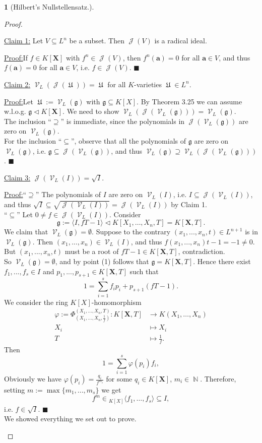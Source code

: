\documentclass[12pt,a4paper]{report}
\theoremstyle{definition}
\theoremstyle{num.custom-title}
\newtheorem{teo_custom-title}[theorem]{} %
\newenvironment{claim}[1]{\par\noindent\underline{Claim#1:}\space}{} %
\newenvironment{claimproof}[1]{\par\noindent\underline{Proof:}\space#1}{\leavevmode\unskip\penalty9999 \hbox{}\nobreak\hfill\quad\hbox{$\blacksquare$}} %
\DeclareMathOperator{\J}{\mathcal{J}}
\DeclareMathOperator{\N}{\mathbb{N}}
\DeclareMathOperator{\U}{\mathfrak{U}}
\DeclareMathOperator{\V}{\mathcal{V}}
\DeclareMathOperator{\sse}{\subseteq}
\newcommand{\g}{\mathfrak{g}}
\newcommand{\X}{\mathbf{X}}
\renewcommand{\phi}{\varphi}
\begin{document}
\begin{teo_custom-title}[Hilbert's Nullstellensatz.]
\begin{proof}
\begin{enumerate}
\begin{claim}{ 1}
Let $V \sse L^n$ be a subset. Then $\J(V)$ is a radical ideal.
\begin{claimproof}
If $f \in K[\X]$ with $f^n \in \J(V)$, then $f^n(\mathbf{a})=0$ for all $\mathbf{a} \in V$, and thus $f(\mathbf{a})=0$ for all $\mathbf{a} \in V$, i.e. $f \in \J(V)$.
\end{claimproof}
\end{claim}
\begin{claim}{ 2}
$\V_L(\J(\U))=\U$ for all $K$-varieties $\U \in L^n$.
\begin{claimproof}
Let $\U := \V_L(\g)$ with $\g \sse K[X]$. By Theorem 3.25 we can assume w.l.o.g. $\g \lhd K[\X]$. We need to show $\V_L(\J(\V_L(\g))) = \V_L(\g)$.\\
The inclusion ``$\supseteq$'' is immediate, since the polynomials in $\J(\V_L(\g))$ are zero on $\V_L(\g)$.\\
For the inclusion ``$\sse$'', observe that all the polynomials of $\g$ are zero on $\V_L(\g)$, i.e. $\g \sse \J(\V_L(\g))$, and thus $\V_L(\g) \supseteq \V_L(\J(\V_L(\g)))$.
\end{claimproof}
\end{claim}
\begin{claim}{ 3}
$\J(\V_L(I))=\sqrt{I}$.
\begin{claimproof}
``$\supseteq$'' The polynomials of $I$ are zero on $\V_L(I)$, i.e. $I \sse \J(\V_L(I))$, and thus $\sqrt{I} \sse \sqrt{\J(\V_L(I))} = \J(\V_L(I))$ by Claim 1.\\
``$\sse$'' Let $0 \neq f \in \J(\V_L(I))$. Consider
\[
\g := \langle I, fT-1 \rangle \lhd K[X_1,\ldots,X_n,T] = K[\X,T].
\]
We claim that $\V_L(\g)=\emptyset$. Suppose to the contrary $(x_1,...,x_n,t) \in L^{n+1}$ is in $\V_L(\g)$. Then $(x_1,...,x_n) \in \V_L(I)$, and thus $f(x_1,...,x_n)t-1 = -1 \neq 0$. But $(x_1,...,x_n,t)$ must be a root of $fT-1 \in K[\X,T]$, contradiction.\\
So $\V_L(\g)=\emptyset$, and by point (1) follows that $\g=K[\X,T]$. Hence there exist $f_1,...,f_s \in I$ and $p_1,...,p_{s+1} \in K[\X,T]$ such that
\[
1 = \sum_{i=1}^s f_i p_i + p_{s+1}(fT-1).
\]
We consider the ring $K[X]$-homomorphism
\begin{align*}
\phi := \Phi_{(X_1,\ldots,X_n, \frac{1}{f})}^{(X_1,\ldots,X_n,T)} : K[\X,T] & \to K(X_1,\ldots,X_n) \\
X_i & \mapsto X_i \\
T & \mapsto \frac{1}{f}.
\end{align*}
Then
\[
1 = \sum_{i=1}^s \phi(p_i)f_i,
\]
Obviously we have $\phi(p_i) = \frac{q_i}{f^{m_i}}$ for some $q_i \in K[\X]$, $m_i \in \N$. Therefore, setting $m := \max\{m_1,...,m_s\}$ we get
\[
f^m \in {}_{K[X]} \langle f_1, \ldots, f_s \rangle \sse I,
\]
i.e. $f \in \sqrt{I}$.
\end{claimproof}
\end{claim}\\
We showed everything we set out to prove.
\end{enumerate}
\end{proof}
\end{teo_custom-title}
\end{document}
